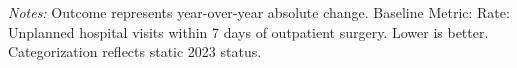 \begin{table}[htbp]
    \centering
    \caption{Timeline of Change in HOPD Metric: OP-36 by Authority}
    \label{tab:d_hopd_op_36_timeline}
    \vspace{0.2cm}
    \vspace{0.1cm}
    \begin{minipage}{\textwidth}
        \footnotesize \textit{Notes:} Outcome represents year-over-year absolute change. Baseline Metric: Rate: Unplanned hospital visits within 7 days of outpatient surgery. Lower is better. Categorization reflects static 2023 status.
    \end{minipage}
\end{table}